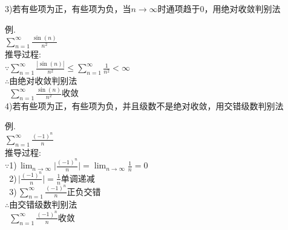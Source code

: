 3)若有些项为正，有些项为负，当$n\to\infty$时通项趋于0，用绝对收敛判别法
{\par\centering
{}}

例.\\
$\displaystyle\sum_{n=1}^{\infty}\frac{\sin(n)}{n^2}$\\[1ex]
推导过程:\\
$\because\displaystyle\sum_{n=1}^{\infty}\frac{|\sin(n)|}{n^2}\leqslant\sum_{n=1}^{\infty}\frac{1}{n^2}<\infty$\\
$\therefore$由绝对收敛判别法\\
$\phantom{\therefore}\displaystyle\sum_{n=1}^{\infty}\frac{\sin(n)}{n^2}$收敛\\[2ex]

4)若有些项为正，有些项为负，并且级数不是绝对收敛，用交错级数判别法
{\par\centering
{}}

例.\\
$\displaystyle\sum_{n=1}^{\infty}\frac{(-1)^n}{n}$\\[1ex]
推导过程:\\
$\because$1)\,$\displaystyle\lim_{n\to\infty}\Big|\frac{(-1)^n}{n}\Big|=\lim_{n\to\infty}\frac{1}{n}=0$\\
$\phantom{\because}$2)\,$\displaystyle\Big|\frac{(-1)^n}{n}\Big|=\frac{1}{n}$单调递减\\
$\phantom{\because}$3)\,$\displaystyle\sum_{n=1}^{\infty}\frac{(-1)^n}{n}$正负交错\\
$\therefore$由交错级数判别法\\
$\phantom{\therefore}\displaystyle\sum_{n=1}^{\infty}\frac{(-1)^n}{n}$收敛\\[2ex]

